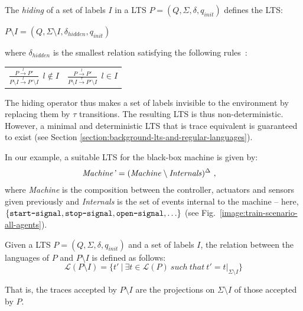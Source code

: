 \begin{definition}
The \emph{hiding} of a set of labels $I$ in a LTS $P = (Q,\Sigma,\delta,q_{init})$ defines the LTS:
\begin{center}
$P \setminus I = (Q,\Sigma \setminus I,\delta_{hidden},q_{init})$
\end{center}
\noindent where $\delta_{hidden}$ is the smallest relation satisfying the following rules~\cite{Giannakopoulou:1999}:
\end{definition}

\begin{center}
\begin{tabular}{cc}
$\frac{\displaystyle P \stackrel{l}{\longrightarrow} P'}{\displaystyle P \setminus I \stackrel{l}{\longrightarrow} P' \setminus I}~~l \notin I$ & 
$\frac{\displaystyle P \stackrel{l}{\longrightarrow} P'}{\displaystyle P \setminus I \stackrel{\tau}{\longrightarrow} P' \setminus I}~~l \in I$ \\
\end{tabular}
\end{center}

The hiding operator thus makes a set of labels invisible to the environment by replacing them by $\tau$ transitions. The resulting LTS is thus non-deterministic. However, a minimal and deterministic LTS that is trace equivalent is guaranteed to exist (see Section \ref{section:background-lts-and-regular-languages}). 

In our example, a suitable LTS for the black-box machine is given by:
\begin{align*}
\mbox{\emph{Machine'}} &= (\mbox{\emph{Machine}} \setminus \mbox{\emph{Internals}})^\Delta~,
\end{align*}
where \emph{Machine} is the composition between the controller, actuators and sensors given previously and \emph{Internals} is the set of events internal to the machine -- here, $\{\texttt{start-signal}, \texttt{stop-signal}, \texttt{open-signal}, \ldots\}$ (see Fig.~\ref{image:train-scenario-all-agents}).

Given a LTS $P = (Q,\Sigma,\delta,q_{init})$ and a set of labels $I$, the relation between the languages of $P$ and $P \setminus I$ is defined as follows:
\begin{equation*}
\mathcal{L}(P \setminus I) = \{ t'~|~\exists t \in \mathcal{L}(P)~such~that~t' = t|_{\Sigma \setminus I}\}
\end{equation*}

That is, the traces accepted by $P \setminus I$ are the projections on $\Sigma \setminus I$ of those accepted by $P$.
